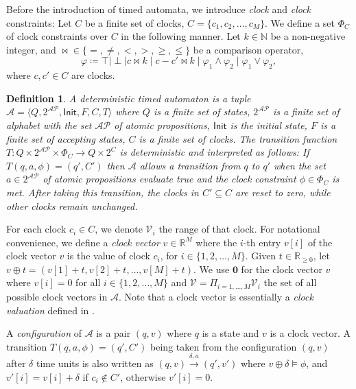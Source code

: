 \documentclass[letterpaper, 10 pt, conference]{ieeeconf}
\newtheorem{definition}{Definition}
\newcommand{\calA}{\mathcal{A}}
\newcommand{\bbR}{\mathbb{R}}
\newcommand{\calV}{\mathcal{V}}
\newcommand{\calAP}{\mathcal{AP}}
\newcommand{\init}{\mathsf{Init}}
\newcommand{\nat}{\mathbb{N}}
\begin{document}
Before the introduction of timed automata, we introduce \emph{clock}
and \emph{clock} constraints: Let $C$ be a finite set of clocks,
$C= \{c_1,c_2,\ldots, c_M\}$. We define a set $\Phi_C$ of clock
constraints over $C$ in the following manner. Let $k \in \nat$ be a
non-negative integer, and $\bowtie \in \{=,\ne , <, >, \ge, \le \}$ be
a comparison operator,
\[
\varphi\coloneqq \top \mid \perp \mid c \bowtie k \mid c-c' \bowtie k
\mid \varphi_1\land\varphi_2\mid \varphi_1\lor \varphi_2,
\]
where $c, c'\in C$ are clocks.
\begin{definition}\cite{Alur1994183}
  A \emph{deterministic timed automaton} is a tuple
  $\calA=\langle Q, 2^{\calAP}, \init, F, C, T \rangle$ where $Q$ is a
  finite set of states, $2^{\calAP}$ is a finite set of alphabet with
  the set $\calAP$ of atomic propositions, $\init$ is the initial
  state, $F$ is a finite set of accepting states, $C$ is a finite set
  of clocks. The transition function
  $T: Q\times 2^\calAP\times \Phi_C \rightarrow Q \times 2^C $ is
  deterministic and interpreted as follows: If
  $T(q, a, \phi)=(q', C')$ then $\calA$ allows a transition from
  $q$ to $q'$ when the set $a \in 2^{\calAP}$ of atomic propositions
  evaluate true and the clock constraint $\phi \in \Phi_C$ is
  met. After taking this transition, the clocks in $C'\subseteq C$ are
  reset to zero, while other clocks remain unchanged.
\end{definition} 







For each clock $c_i \in C$, we denote $\calV_i$ the range of that
clock.  For notational convenience, we define a \emph{clock vector}
$v \in \bbR^M$ where the $i$-th entry $v[i]$ of the clock vector $v$
is the value of clock $c_i$, for $i\in \{1,2,\ldots, M\}$. Given
$t\in \mathbb{R}_{\ge 0}$, let
$v\oplus t= (v[1]+t, v[2]+t,\ldots, v[M]+t)$.  We use $\bm 0$ for the
clock vector $v$ where $v[i]=0$ for all $i \in \{1,2,\ldots, M\}$ and
$\calV = \Pi_{i=1,\ldots,M} \calV_i$ the set of all possible clock
vectors in $\calA$. Note that a clock vector is essentially a
\emph{clock valuation} defined in \cite{Alur1994183}.

A \emph{configuration} of $\calA$ is a pair $(q, v)$ where $q$ is a
state and $v$ is a clock vector. A transition
$T(q,a, \phi)= (q', C')$ being taken from the configuration $(q,v)$
after $\delta$ time units is also written as
$(q,v)\xrightarrow{\delta, a}(q',v')$ where
$v \oplus \delta \models \phi$, and $v'[i]= v[i]+\delta$ if
$c_i\notin C'$, otherwise $v'[i]=0$.
\end{document}

